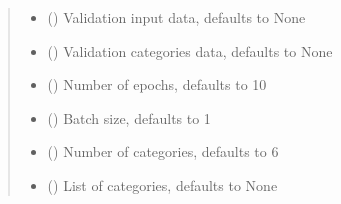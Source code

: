 \documentclass[letterpaper,10pt,english]{sphinxmanual}
\begin{document}
\begin{fulllineitems}
\begin{quote}
\begin{description}
\begin{itemize}
\item {} 
\sphinxAtStartPar
{} (\sphinxstyleliteralemphasis{\sphinxupquote{, }}) \textendash{} Validation input data, defaults to None

\item {} 
\sphinxAtStartPar
{} (\sphinxstyleliteralemphasis{\sphinxupquote{, }}) \textendash{} Validation categories data, defaults to None

\item {} 
\sphinxAtStartPar
{} (\sphinxstyleliteralemphasis{\sphinxupquote{, }}) \textendash{} Number of epochs, defaults to 10

\item {} 
\sphinxAtStartPar
{} (\sphinxstyleliteralemphasis{\sphinxupquote{, }}) \textendash{} Batch size, defaults to 1

\item {} 
\sphinxAtStartPar
{} (\sphinxstyleliteralemphasis{\sphinxupquote{, }}) \textendash{} Number of categories, defaults to 6

\item {} 
\sphinxAtStartPar
{} (\sphinxstyleliteralemphasis{\sphinxupquote{{[}}}\sphinxstyleliteralemphasis{\sphinxupquote{{]}}}\sphinxstyleliteralemphasis{\sphinxupquote{, }}) \textendash{} List of categories, defaults to None

\end{itemize}

\end{description}\end{quote}

\end{fulllineitems}
\end{document}
